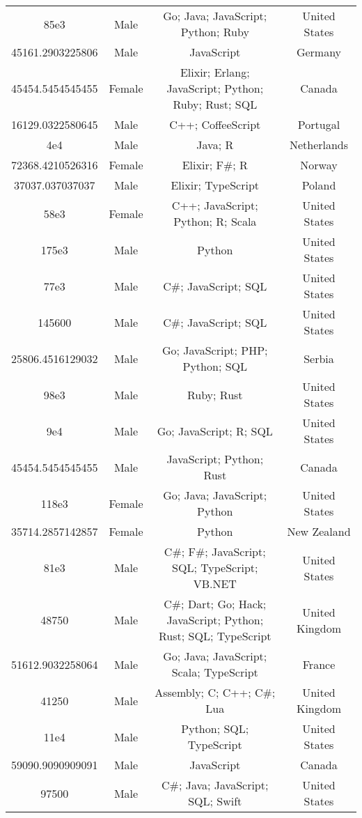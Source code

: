 \begin{center}
\begin{tabular}{ |c|c|c|c| }
85e3  &  Male  &  Go; Java; JavaScript; Python; Ruby  &  United States  \\ 
45161.2903225806  &  Male  &  JavaScript  &  Germany  \\ 
45454.5454545455  &  Female  &  Elixir; Erlang; JavaScript; Python; Ruby; Rust; SQL  &  Canada  \\ 
16129.0322580645  &  Male  &  C++; CoffeeScript  &  Portugal  \\ 
4e4  &  Male  &  Java; R  &  Netherlands  \\ 
72368.4210526316  &  Female  &  Elixir; F\#; R  &  Norway  \\ 
37037.037037037  &  Male  &  Elixir; TypeScript  &  Poland  \\ 
58e3  &  Female  &  C++; JavaScript; Python; R; Scala  &  United States  \\ 
175e3  &  Male  &  Python  &  United States  \\ 
77e3  &  Male  &  C\#; JavaScript; SQL  &  United States  \\ 
145600  &  Male  &  C\#; JavaScript; SQL  &  United States  \\ 
25806.4516129032  &  Male  &  Go; JavaScript; PHP; Python; SQL  &  Serbia  \\ 
98e3  &  Male  &  Ruby; Rust  &  United States  \\ 
9e4  &  Male  &  Go; JavaScript; R; SQL  &  United States  \\ 
45454.5454545455  &  Male  &  JavaScript; Python; Rust  &  Canada  \\ 
118e3  &  Female  &  Go; Java; JavaScript; Python  &  United States  \\ 
35714.2857142857  &  Female  &  Python  &  New Zealand  \\ 
81e3  &  Male  &  C\#; F\#; JavaScript; SQL; TypeScript; VB.NET  &  United States  \\ 
48750  &  Male  &  C\#; Dart; Go; Hack; JavaScript; Python; Rust; SQL; TypeScript  &  United Kingdom  \\ 
51612.9032258064  &  Male  &  Go; Java; JavaScript; Scala; TypeScript  &  France  \\ 
41250  &  Male  &  Assembly; C; C++; C\#; Lua  &  United Kingdom  \\ 
11e4  &  Male  &  Python; SQL; TypeScript  &  United States  \\ 
59090.9090909091  &  Male  &  JavaScript  &  Canada  \\ 
97500  &  Male  &  C\#; Java; JavaScript; SQL; Swift  &  United States  \\ 

\end{tabular}
\end{center}
